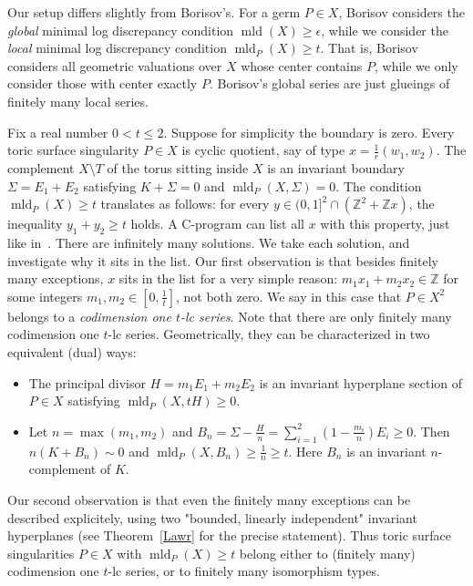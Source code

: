 \documentclass[12pt,reqno]{amsart}
\newcommand{\Z}{{\mathbb Z}}
\newcommand{\mld}{\operatorname{mld}}
\theoremstyle{plain}
\theoremstyle{definition}
\theoremstyle{remark}
\begin{document}
Our setup differs slightly from Borisov's. For a germ $P\in X$, Borisov considers the {\em global} minimal log discrepancy condition 
$\mld(X)\ge \epsilon$, while we consider the {\em local} minimal log discrepancy condition $\mld_P(X)\ge t$. That is, Borisov considers all geometric valuations over $X$ whose center contains $P$, while we only consider those with center exactly $P$. Borisov's global series are just glueings of finitely many local series.

Fix a real number $0< t\le 2$. Suppose for simplicity the boundary is zero. Every toric surface singularity $P\in X$ is cyclic quotient, say of type $x=\frac{1}{r}(w_1,w_2)$. The complement $X\setminus T$ of the torus sitting inside $X$ is an invariant boundary $\Sigma=E_1+E_2$ satisfying $K+\Sigma=0$ and $\mld_P(X,\Sigma)=0$. The condition $\mld_P(X)\ge t$ translates as follows: for every $y\in (0,1]^2\cap (\Z^2+\Z x)$, the inequality $y_1+y_2\ge t$ holds. A C-program can list all $x$ with this property, just like in~\cite{MMS88}. There are infinitely many solutions. We take each solution, and investigate why it sits in the list. Our first observation is that besides finitely many exceptions, $x$ sits in the list for a very simple reason: $m_1x_1+m_2x_2\in \Z$ for some integers $m_1,m_2 \in [0,\frac{1}{t}]$, not both zero. We say in this case that $P\in X^2$ belongs to a {\em codimension one $t$-lc series}.
Note that there are only finitely many codimension one $t$-lc series. Geometrically, they can be characterized in two equivalent (dual) ways:
\begin{itemize}
	\item[(H)] The principal divisor $H=m_1E_1+m_2E_2$ is an invariant hyperplane section of $P\in X$ satisfying $\mld_P(X,tH)\ge 0$.
	\item[(C)] Let $n=\max(m_1,m_2)$ and $B_n=\Sigma-\frac{H}{n}=\sum_{i=1}^2(1-\frac{m_i}{n})E_i\ge 0$. Then
	$n(K+B_n)\sim 0$ and $\mld_P(X,B_n)\ge \frac{1}{n}\ge t$. Here $B_n$ is an invariant $n$-complement of $K$.
\end{itemize}

Our second observation is that even the finitely many exceptions can be described explicitely, using two "bounded, linearly independent" invariant hyperplanes (see Theorem~\ref{Lawr} for the precise statement).  Thus toric surface singularities $P\in X$ with $\mld_P(X)\ge t$ belong either to (finitely many) codimension one $t$-lc series, or to finitely many isomorphism types.
\end{document}
